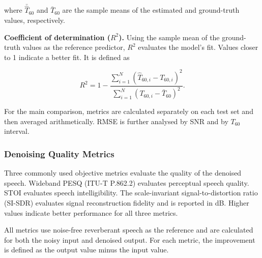 \documentclass[a4paper,fleqn]{cas-sc}
\begin{document}


\noindent where $\bar{\hat{T}}_{60}$ and $\bar{T}_{60}$ are the sample means of the estimated and ground-truth values, respectively.



\textbf{Coefficient of determination ($R^{2}$).} Using the sample mean of the ground-truth values as the reference predictor, $R^{2}$ evaluates the model's fit. Values closer to 1 indicate a better fit. It is defined as



\begin{equation}
R^{2}=1-\frac{\sum_{i=1}^{N}(\hat{T}_{60,i}-T_{60,i})^{2}}{\sum_{i=1}^{N}(T_{60,i}-\bar{T}_{60})^{2}}. \tag{25}\label{eq:r2}
\end{equation}



For the main comparison, metrics are calculated separately on each test set and then averaged arithmetically. RMSE is further analysed by SNR and by $T_{60}$ interval.



\subsubsection{Denoising Quality Metrics}
\label{sec:denoise_metrics}



Three commonly used objective metrics evaluate the quality of the denoised speech. Wideband PESQ (ITU-T P.862.2) \citep{itut2007p8622} evaluates perceptual speech quality. STOI \citep{taal2011stoi} evaluates speech intelligibility. The scale-invariant signal-to-distortion ratio (SI-SDR) \citep{leroux2019sisdr} evaluates signal reconstruction fidelity and is reported in dB. Higher values indicate better performance for all three metrics.



All metrics use noise-free reverberant speech as the reference and are calculated for both the noisy input and denoised output. For each metric, the improvement is defined as the output value minus the input value.
\end{document}
